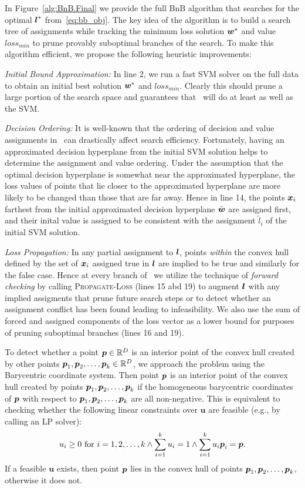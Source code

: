 In Figure~\ref{alg:BnB.Final} we provide the full BnB algorithm that
searches for the optimal $\boldsymbol{l}^*$ from~\eqref{eq:bb_obj}.  The key idea
of the algorithm is to build a search tree of assignments while
tracking the minimum loss solution $\boldsymbol{w}^*$ and value $loss_{min}$ to
prune provably suboptimal branches of the search.  To make this
algorithm efficient, we propose the following heuristic improvements:

\noindent \emph{Initial Bound Approximation:} In line 2, we run a fast
SVM solver on the full data to obtain an initial best solution $\boldsymbol{w}^*$
and $loss_{min}$.  Clearly this should prune a large portion of the
search space and guarantees that \BB\ will do at least as well as
the SVM.

\noindent \emph{Decision Ordering:} It is well-known that the ordering
of decision and value assignments in \BB\ can drastically affect
search efficiency.  Fortunately, having an approximated decision
hyperplane from the initial SVM solution helps to determine the
assignment and value ordering. Under the assumption that the optimal
decision hyperplane is somewhat near the approximated hyperplane, the
loss values of points that lie closer to the approximated hyperplane
are more likely to be changed than those that are far away.  Hence in
line 14, the points $\boldsymbol{x}_i$ farthest from the initial approximated
decision hyperplane $\tilde{\boldsymbol{w}}$ are assigned first, and their inital
value is assigned to be consistent with the assignment $\tilde{l}_i$
of the initial SVM solution.

\noindent \emph{Loss Propagation:} In any partial assignment to $\boldsymbol{l}$,
points \emph{within} the convex hull defined by the set of $\boldsymbol{x}_i$
assigned true in $\boldsymbol{l}$ are implied to be true and similarly for the
false case.  Hence at every branch of \BB\ we utilize the technique of
\emph{forward checking} by calling \textsc{Propagate-Loss} (lines 15
abd 19) to augment $\boldsymbol{l}$ with any implied assigments that prune future
search steps or to detect whether an assignment conflict has been
found leading to infeasibility.  We also use the sum of forced and
assigned components of the loss vector as a lower bound for purposes
of pruning suboptimal branches (lines 16 and 19).

To detect whether a point $\boldsymbol{p} \in \mathbb{R}^D$ is an interior point
of the convex hull created by other points $\boldsymbol{p}_1,
\boldsymbol{p}_2, \dots, \boldsymbol{p}_k \in \mathbb{R}^D$, we approach the problem
using the Barycentric coordinate system.  Then point $\boldsymbol{p}$ is
an interior point of the convex hull created by points $\boldsymbol{p}_1,
\boldsymbol{p}_2, \dots, \boldsymbol{p}_k$ if the homogeneous barycentric
coordinates of $\boldsymbol{p}$ with respect to $\boldsymbol{p}_1,
\boldsymbol{p}_2, \dots, \boldsymbol{p}_k$ are all non-negative. This is
equivalent to checking whether the following linear constraints over
$\mathbf{u}$ are feasible (e.g., by calling an LP solver):
$$
u_i \geq 0 \text{ for } i = 1,2, \dots, k \land \sum_{i=1}^k u_i = 1 \land \sum_{i=1}^k u_i \boldsymbol{p}_i = \boldsymbol{p}. 
$$ If a feasible $\mathbf{u}$ exists, then point $\boldsymbol{p}$
lies in the convex hull of points $\boldsymbol{p}_1, \boldsymbol{p}_2, \dots,
\boldsymbol{p}_k$, otherwise it does not.

